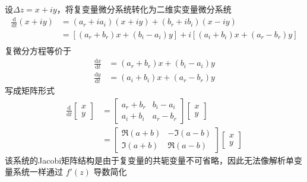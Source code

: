 设$\Delta z=x+iy$，将复变量微分系统转化为二维实变量微分系统
\begin{align*}
    \frac{\mathrm{d}}{\mathrm{d}t}(x+iy)&=(a_{r}+ia_{i})(x+iy)+(b_{r}+ib_{i})(x-iy)\\
&=[(a_{r}+b_{r})x+(b_{i}-a_{i})y]+i[(a_{i}+b_{i})x+(a_{r}-b_{r})y]\\
\end{align*}
复微分方程等价于
\begin{align*}
    \frac{\mathrm{d}x}{\mathrm{d}t}&=(a_{r}+b_{r})x+(b_{i}-a_{i})y\\
    \frac{\mathrm{d}y}{\mathrm{d}t}&=(a_{i}+b_{i})x+(a_{r}-b_{r})y
\end{align*}
写成矩阵形式
\begin{align*}
    \frac{\mathrm{d}}{\mathrm{d}t}
\begin{bmatrix}
    x \\
    y 
\end{bmatrix}
&=
\begin{bmatrix}
    a_{r}+b_{r} & b_{i}-a_{i} \\
    a_{i}+b_{i} & a_{r}-b_{r}
\end{bmatrix}
\begin{bmatrix}
    x \\
    y 
\end{bmatrix}\\
&=
\begin{bmatrix}
    \Re(a+b) & -\Im(a-b) \\
    \Im(a+b) &  \Re(a-b)
\end{bmatrix}
\begin{bmatrix}
    x \\
    y 
\end{bmatrix}
\end{align*}
该系统的Jacobi矩阵结构是由于复变量的共轭变量不可省略，因此无法像解析单变量系统一样通过 $f'(z)$ 导数简化

